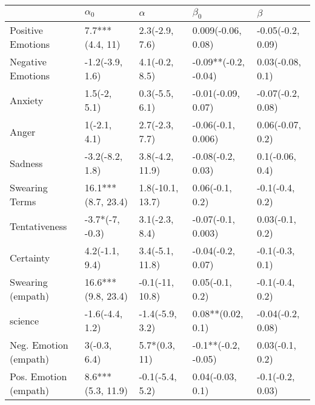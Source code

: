 \begin{tabular}{lllll}
\toprule
{} &          $\alpha_0$ &          $\alpha$ &             $\beta_0$ &            $\beta$ \\
\midrule
Positive Emotions     &     7.7***(4.4, 11) &    2.3(-2.9, 7.6) &    0.009(-0.06, 0.08) &  -0.05(-0.2, 0.09) \\
Negative Emotions     &     -1.2(-3.9, 1.6) &    4.1(-0.2, 8.5) &  -0.09**(-0.2, -0.04) &   0.03(-0.08, 0.1) \\
Anxiety               &        1.5(-2, 5.1) &    0.3(-5.5, 6.1) &    -0.01(-0.09, 0.07) &  -0.07(-0.2, 0.08) \\
Anger                 &        1(-2.1, 4.1) &    2.7(-2.3, 7.7) &    -0.06(-0.1, 0.006) &   0.06(-0.07, 0.2) \\
Sadness               &     -3.2(-8.2, 1.8) &   3.8(-4.2, 11.9) &     -0.08(-0.2, 0.03) &    0.1(-0.06, 0.4) \\
Swearing Terms        &  16.1***(8.7, 23.4) &  1.8(-10.1, 13.7) &       0.06(-0.1, 0.2) &    -0.1(-0.4, 0.2) \\
Tentativeness         &     -3.7*(-7, -0.3) &    3.1(-2.3, 8.4) &    -0.07(-0.1, 0.003) &    0.03(-0.1, 0.2) \\
Certainty             &      4.2(-1.1, 9.4) &   3.4(-5.1, 11.8) &     -0.04(-0.2, 0.07) &    -0.1(-0.3, 0.1) \\
Swearing (empath)     &  16.6***(9.8, 23.4) &   -0.1(-11, 10.8) &       0.05(-0.1, 0.2) &    -0.1(-0.4, 0.2) \\
science               &     -1.6(-4.4, 1.2) &   -1.4(-5.9, 3.2) &     0.08**(0.02, 0.1) &  -0.04(-0.2, 0.08) \\
Neg. Emotion (empath) &        3(-0.3, 6.4) &     5.7*(0.3, 11) &   -0.1**(-0.2, -0.05) &    0.03(-0.1, 0.2) \\
Pos. Emotion (empath) &   8.6***(5.3, 11.9) &   -0.1(-5.4, 5.2) &      0.04(-0.03, 0.1) &   -0.1(-0.2, 0.03) \\
\bottomrule
\end{tabular}
